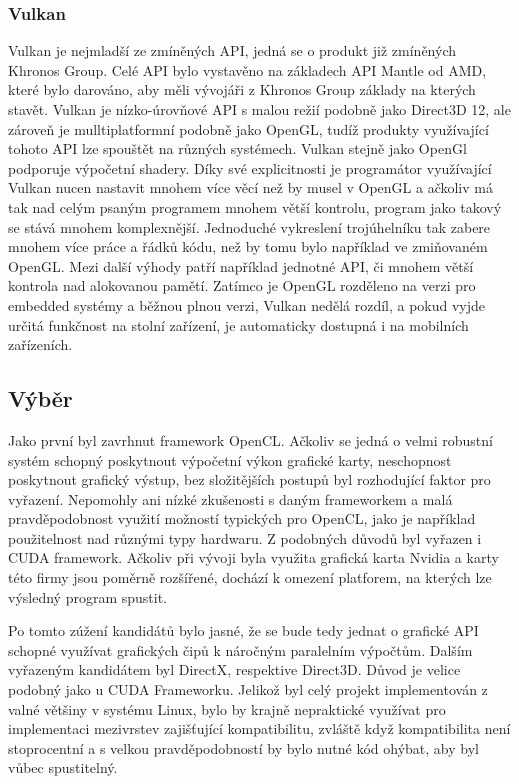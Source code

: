 \subsubsection{Vulkan}
Vulkan je nejmladší ze zmíněných API, jedná se o produkt již zmíněných Khronos Group. Celé API bylo vystavěno na základech API Mantle od AMD, které bylo darováno, aby měli vývojáři z Khronos Group základy na kterých stavět. Vulkan je nízko-úrovňové API s malou režií podobně jako Direct3D 12, ale zároveň je mulltiplatformní podobně jako OpenGL, tudíž produkty využívající tohoto API lze spouštět na různých systémech. Vulkan stejně jako OpenGl podporuje výpočetní shadery. Díky své explicitnosti je programátor využívající Vulkan nucen nastavit mnohem více věcí než by musel v OpenGL a ačkoliv má tak nad celým psaným programem mnohem větší kontrolu, program jako takový se stává mnohem komplexnější. Jednoduché vykreslení trojúhelníku tak zabere mnohem více práce a řádků kódu, než by tomu bylo například ve zmiňovaném OpenGL. Mezi další výhody patří například jednotné API, či mnohem větší kontrola nad alokovanou pamětí. Zatímco je OpenGL rozděleno na verzi pro embedded systémy a běžnou plnou verzi, Vulkan nedělá rozdíl, a pokud vyjde určitá funkčnost na stolní zařízení, je automaticky dostupná i na mobilních zařízeních. \cite{singh2016learning} \cite{vulkanSpec}

\subsection{Výběr}
Jako první byl zavrhnut framework OpenCL. Ačkoliv se jedná o velmi robustní systém schopný poskytnout výpočetní výkon grafické karty, neschopnost poskytnout grafický výstup, bez složitějších postupů byl rozhodující faktor pro vyřazení. Nepomohly ani nízké zkušenosti s daným frameworkem a malá pravděpodobnost využití možností typických pro OpenCL, jako je například použitelnost nad různými typy hardwaru. Z podobných důvodů byl vyřazen i CUDA framework. Ačkoliv při vývoji byla využita grafická karta Nvidia a karty této firmy jsou poměrně rozšířené, dochází k omezení platforem, na kterých lze výsledný program spustit.

Po tomto zúžení kandidátů bylo jasné, že se bude tedy jednat o grafické API schopné využívat grafických čipů k náročným paralelním výpočtům. Dalším vyřazeným kandidátem byl DirectX, respektive Direct3D. Důvod je velice podobný jako u CUDA Frameworku. Jelikož byl celý projekt implementován z valné většiny v systému Linux, bylo by krajně nepraktické využívat pro implementaci mezivrstev zajišťující kompatibilitu, zvláště když kompatibilita není stoprocentní a s velkou pravděpodobností by bylo nutné kód ohýbat, aby byl vůbec spustitelný. 

